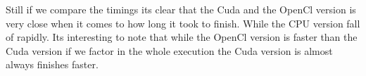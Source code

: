 Still if we compare the timings its clear that the Cuda and the OpenCl version is very close when it comes to how long it took to finish. While the \ac{CPU} version fall of rapidly. Its interesting to note that while the OpenCl version is faster than the Cuda version if we factor in the whole execution the Cuda version is almost always finishes faster.
